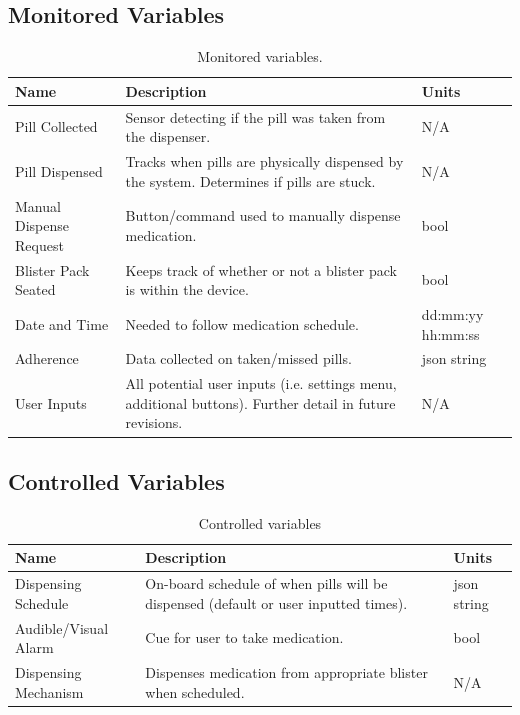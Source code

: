 \documentclass[12pt,titlepage]{article}
\begin{document}
\subsection{Monitored Variables}
\begin{table}[ht!]
\begin{center}
\begin{adjustbox}{max width=\textwidth}
\small
\begin{tabular}{|p{}|p{}|p{}|}
 \hline
 \textbf{Name} & \textbf{Description} & \textbf{Units}\\
 \hline 
Pill Collected & Sensor detecting if the pill was taken from the dispenser. & N/A\\
 \hline
 Pill Dispensed & Tracks when pills are physically dispensed by the system. Determines if pills are stuck.  & N/A\\
 \hline
 Manual Dispense Request & Button/command used to manually dispense medication. & bool \\
 \hline
  Blister Pack Seated & Keeps track of whether or not a blister pack is within the device. & bool \\
 \hline
Date and Time & Needed to follow medication schedule. & dd:mm:yy hh:mm:ss\\
 \hline
Adherence & Data collected on taken/missed pills. & json string\\
 \hline
User Inputs & All potential user inputs (i.e. settings menu, additional buttons). Further detail  in future revisions. & N/A\\
 \hline

\end{tabular}
\end{adjustbox}
\end{center}
\caption{Monitored variables.}
\end{table}

\subsection{Controlled Variables}
\begin{table}[ht!]
\begin{center}
\begin{adjustbox}{max width=\textwidth}
\small
\begin{tabular}{|p{}|p{}|p{}|}
 \hline
 \textbf{Name} & \textbf{Description} & \textbf{Units}\\
 \hline 
Dispensing Schedule & On-board schedule of when pills will be dispensed (default or user inputted times). & json string \\
 \hline
 Audible/Visual Alarm & Cue for user to take medication. & bool \\
 \hline
 Dispensing Mechanism & Dispenses medication from appropriate blister when scheduled. & N/A\\
 \hline
\end{tabular}
\end{adjustbox}
\end{center}
\caption{Controlled variables}
\end{table}
\end{document}
